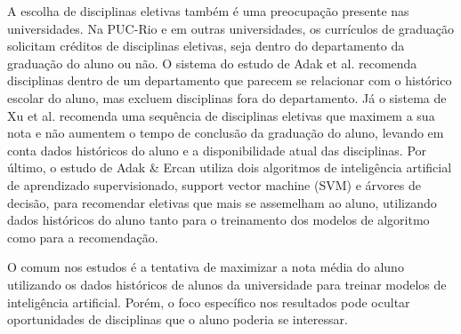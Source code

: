 A escolha de disciplinas eletivas também é uma preocupação presente nas universidades. Na PUC-Rio e em outras universidades, os currículos de graduação solicitam créditos de disciplinas eletivas, seja dentro do departamento da graduação do aluno ou não. O sistema do estudo de Adak et al.\cite{adak-fuzzy} recomenda disciplinas dentro de um departamento que parecem se relacionar com o histórico escolar do aluno, mas excluem disciplinas fora do departamento.
Já o sistema de Xu et al.\cite{xu-personalizado} recomenda uma sequência de disciplinas eletivas que maximem a sua nota e não aumentem o tempo de conclusão da graduação do aluno, levando em conta dados históricos do aluno e a disponibilidade atual das disciplinas. 
Por último, o estudo de Adak \& Ercan\cite{adak-svm} utiliza dois algoritmos de inteligência artificial de aprendizado supervisionado, support vector machine (SVM) e árvores de decisão, para recomendar eletivas que mais se assemelham ao aluno, utilizando dados históricos do aluno tanto para o treinamento dos modelos de algoritmo como para a recomendação.

O comum nos estudos é a tentativa de maximizar a nota média do aluno utilizando os dados históricos de alunos da universidade para treinar modelos de inteligência artificial.\cite{rani-machine-learning,nguyen-learning-outcome,adak-fuzzy,adak-svm} Porém, o foco específico nos resultados pode ocultar oportunidades de disciplinas que o aluno poderia se interessar.


